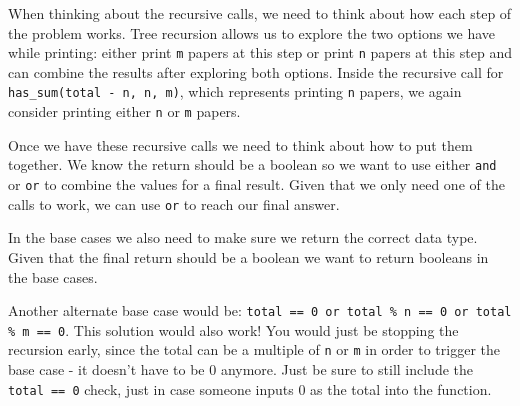 \begin{blocksection}
\begin{solution}
When thinking about the recursive calls, we need to think about how each step of the problem works. Tree recursion allows us to explore the two options we have while printing: either print \lstinline{m} papers at this step or print \lstinline{n} papers at this step and can combine the results after exploring both options. Inside the recursive call for \lstinline{has_sum(total - n, n, m)}, which represents printing \lstinline{n} papers, we again consider printing either \lstinline{n} or \lstinline{m} papers.

Once we have these recursive calls we need to think about how to put them together. We know the return should be a boolean so we want to use either \lstinline{and} or \lstinline{or} to combine the values for a final result. Given that we only need one of the calls to work, we can use \lstinline{or} to reach our final answer.

In the base cases we also need to make sure we return the correct data type. Given that the final return should be a boolean we want to return booleans in the base cases.

Another alternate base case would be: \lstinline{total == 0 or total % n == 0 or total % m == 0}. This solution would also work! You would just be stopping the recursion early, since the total can be a multiple of \lstinline{n} or \lstinline{m} in order to trigger the base case - it doesn’t have to be 0 anymore. Just be sure to still include the \lstinline{total == 0} check, just in case someone inputs 0 as the total into the function.
\end{solution}
\end{blocksection}

